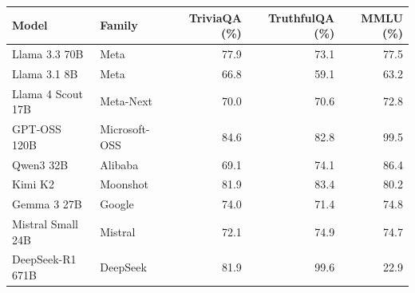 \begin{tabular}{llrrr}
\toprule
Model & Family & TriviaQA (\%) & TruthfulQA (\%) & MMLU (\%) \\
\midrule
Llama 3.3 70B & Meta & 77.9 & 73.1 & 77.5 \\
Llama 3.1 8B & Meta & 66.8 & 59.1 & 63.2 \\
Llama 4 Scout 17B & Meta-Next & 70.0 & 70.6 & 72.8 \\
GPT-OSS 120B & Microsoft-OSS & 84.6 & 82.8 & 99.5 \\
Qwen3 32B & Alibaba & 69.1 & 74.1 & 86.4 \\
Kimi K2 & Moonshot & 81.9 & 83.4 & 80.2 \\
Gemma 3 27B & Google & 74.0 & 71.4 & 74.8 \\
Mistral Small 24B & Mistral & 72.1 & 74.9 & 74.7 \\
DeepSeek-R1 671B & DeepSeek & 81.9 & 99.6 & 22.9 \\
\bottomrule
\end{tabular}
